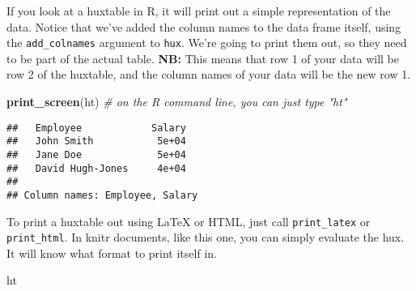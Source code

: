 \documentclass[]{article}
\newenvironment{Shaded}{\begin{snugshade}}{\end{snugshade}}
\newcommand{\KeywordTok}[1]{\textcolor[rgb]{0.13,0.29,0.53}{\textbf{#1}}}
\newcommand{\CommentTok}[1]{\textcolor[rgb]{0.56,0.35,0.01}{\textit{#1}}}
\newcommand{\NormalTok}[1]{#1}
\begin{document}
\FloatBarrier

If you look at a huxtable in R, it will print out a simple
representation of the data. Notice that we've added the column names to
the data frame itself, using the \texttt{add\_colnames} argument to
\texttt{hux}. We're going to print them out, so they need to be part of
the actual table. \textbf{NB:} This means that row 1 of your data will
be row 2 of the huxtable, and the column names of your data will be the
new row 1.

\begin{Shaded}
\begin{Highlighting}[]
\KeywordTok{print_screen}\NormalTok{(ht)     }\CommentTok{# on the R command line, you can just type "ht"}
\end{Highlighting}
\end{Shaded}

\begin{verbatim}
##   Employee            Salary  
##   John Smith           5e+04  
##   Jane Doe             5e+04  
##   David Hugh-Jones     4e+04  
## 
## Column names: Employee, Salary
\end{verbatim}

\FloatBarrier

To print a huxtable out using LaTeX or HTML, just call
\texttt{print\_latex} or \texttt{print\_html}. In knitr documents, like
this one, you can simply evaluate the hux. It will know what format to
print itself in.

\begin{Shaded}
\begin{Highlighting}[]
\NormalTok{ht}
\end{Highlighting}
\end{Shaded}
\end{document}
